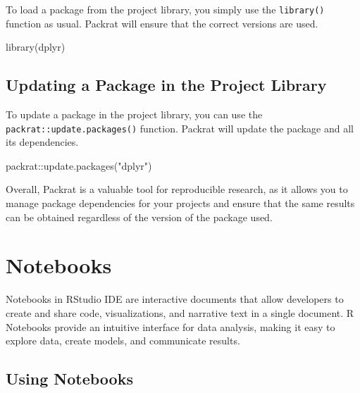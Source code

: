\documentclass[
]{book}
\newenvironment{Shaded}{\begin{snugshade}}{\end{snugshade}}
\newcommand{\FunctionTok}[1]{\textcolor[rgb]{0.00,0.00,0.00}{#1}}
\newcommand{\NormalTok}[1]{#1}
\newcommand{\SpecialCharTok}[1]{\textcolor[rgb]{0.00,0.00,0.00}{#1}}
\newcommand{\StringTok}[1]{\textcolor[rgb]{0.31,0.60,0.02}{#1}}
\begin{document}
To load a package from the project library, you simply use the \texttt{library()} function as usual. Packrat will ensure that the correct versions are used.

\begin{Shaded}
\begin{Highlighting}[]
\FunctionTok{library}\NormalTok{(dplyr)}
\end{Highlighting}
\end{Shaded}

\hypertarget{updating-a-package-in-the-project-library}{%
\subsection*{Updating a Package in the Project Library}\label{updating-a-package-in-the-project-library}}

To update a package in the project library, you can use the \texttt{packrat::update.packages()} function. Packrat will update the package and all its dependencies.

\begin{Shaded}
\begin{Highlighting}[]
\NormalTok{packrat}\SpecialCharTok{::}\FunctionTok{update.packages}\NormalTok{(}\StringTok{"dplyr"}\NormalTok{)}
\end{Highlighting}
\end{Shaded}

Overall, Packrat is a valuable tool for reproducible research, as it allows you to manage package dependencies for your projects and ensure that the same results can be obtained regardless of the version of the package used.

\hypertarget{notebooks}{%
\section{Notebooks}\label{notebooks}}

Notebooks in RStudio IDE are interactive documents that allow developers to create and share code, visualizations, and narrative text in a single document. R Notebooks provide an intuitive interface for data analysis, making it easy to explore data, create models, and communicate results.

\hypertarget{using-notebooks}{%
\subsection*{Using Notebooks}\label{using-notebooks}}
\end{document}
